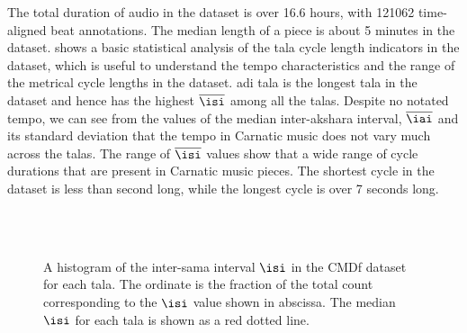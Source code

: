 The total duration of audio in the dataset is over 16.6 hours, with 121062 time-aligned beat annotations. The median length of a piece is about 5 minutes in the dataset.  shows a basic statistical analysis of the \gls{tala} cycle length indicators in the dataset, which is useful to understand the tempo characteristics and the range of the metrical cycle lengths in the dataset. \Gls{adi} \gls{tala} is the longest \gls{tala} in the dataset and hence has the highest $\overline{\isi}$ among all the \glspl{tala}. Despite no notated tempo, we can see from the values of the median inter-\gls{akshara} interval, $\overline{\iai}$ and its standard deviation that the tempo in Carnatic music does not vary much across the \glspl{tala}. The range of $\overline{\isi}$ values show that a wide range of cycle durations that are present in Carnatic music pieces. The shortest cycle in the dataset is less than second long, while the longest cycle is over 7 seconds long. %
\begin{figure}[t]
\centering
{} \hspace{0.5cm} 
 \\ 
 \hspace{0.5cm} 
 \\ 
\caption[Histogram of $\protect\isi$ in the \acrshort{CMDf} dataset]{A histogram of the inter-\gls{sama} interval $\protect\isi$ in the \acrshort{CMDf} dataset for each \gls{tala}. The ordinate is the fraction of the total count corresponding to the $\isi$ value shown in abscissa. The median $\isi$ for each \gls{tala} is shown as a red dotted line.}\label{fig:dstats:CMDf:ISI}
\end{figure}
